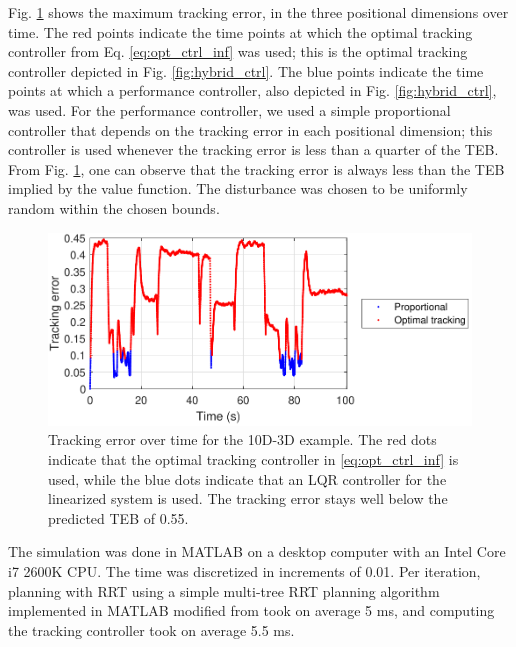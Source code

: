 Fig. \ref{fig:tracking_error_RRT} shows the maximum tracking error, in the three positional dimensions over time.
The red points indicate the time points at which the optimal tracking controller from Eq. \eqref{eq:opt_ctrl_inf} was used; this is the optimal tracking controller depicted in Fig. \ref{fig:hybrid_ctrl}. 
The blue points indicate the time points at which a performance controller, also depicted in Fig. \ref{fig:hybrid_ctrl}, was used.
For the performance controller, we used a simple proportional controller that depends on the tracking error in each positional dimension; this controller is used whenever the tracking error is less than a quarter of the TEB.
From Fig. \ref{fig:tracking_error_RRT}, one can observe that the tracking error is always less than the TEB implied by the value function.
The disturbance was chosen to be uniformly random within the chosen bounds.


\begin{figure}
  \includegraphics[width=\columnwidth]{fig/Q10D_Q3D/tracking_error}
  \caption{Tracking error over time for the 10D-3D example. The red dots indicate that the optimal tracking controller in \eqref{eq:opt_ctrl_inf} is used, while the blue dots indicate that an LQR controller for the linearized system is used. The tracking error stays well below the predicted TEB of 0.55.}
  \label{fig:tracking_error_RRT}  
\end{figure}

The simulation was done in MATLAB on a desktop computer with an Intel Core i7 2600K CPU.
The time was discretized in increments of 0.01.
Per iteration, planning with RRT using a simple multi-tree RRT planning algorithm implemented in MATLAB modified from \cite{Gavin2013} took on average 5 ms, and computing the tracking controller took on average 5.5 ms. 

